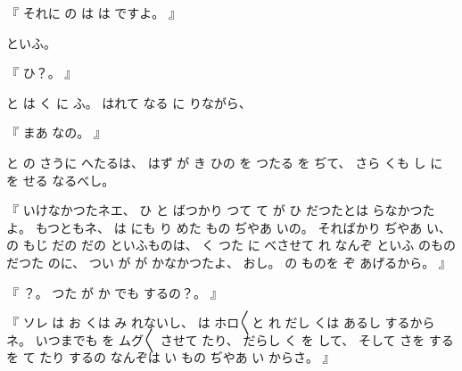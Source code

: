 %
『
それに
の
は
は
ですよ。
』

%
といふ。

%
『
ひ？。
』

%
と
は
く
に
ふ。
%
はれて
なる
に
りながら、

%
『
まあ
なの。
』

%
と
の
さうに
へたるは、
%
はず
が
き
ひの
を
つたる
を
ぢて、
%
さら
くも
し
に
を
せる
なるべし。

%
『
いけなかつたネエ、
%
ひ
と
ばつかり
つて
て
が
ひ
だつたとは
らなかつたよ。
%
もつともネ、
%
は
にも
%
り
めた
もの
ぢやあ
いの。
%
そればかり
ぢやあ
い、
%
の
もじ
だの
だの
といふものは、
%
く
つた
に
べさせて
れ
なんぞ
といふ
のもの
だつた
のに、
%
つい
が
が
かなかつたよ、
%
おし。
%
の
ものを
ぞ
あげるから。
』

%
『
？。
%
つた
が
か
でも
するの？。
』

%
『
ソレ
は%
お
くは
み
れないし、
%
は
ホロ〳〵と
れ
だし
くは
あるし
するからネ。
%
いつまでも
を
ムグ〳〵
させて
たり、
%
だらし
く
を
して、
%
そして
さを
する
を
て
たり
するの
なんぞは
い
もの
ぢやあ
い
からさ。
』

